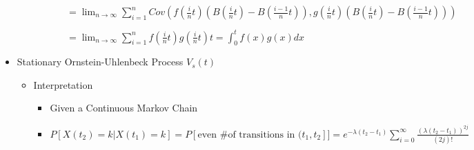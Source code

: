 \documentclass[a4paper]{article}
\begin{document}
\begin{itemize}
\begin{itemize}
\begin{itemize}
\begin{itemize}
                                $= \lim_{n \rightarrow \infty} \sum_{i=1}^n \mathit{Cov}(f(\frac{i}{n}t)(B(\frac{i}{n}t) - B(\frac{i-1}{n}t)), g(\frac{i}{n}t)(B(\frac{i}{n}t) - B(\frac{i-1}{n}t)))$

                                $= \lim_{n \rightarrow \infty} \sum_{i=1}^n f(\frac{i}{n}t)g(\frac{i}{n}t) t = \int_0^t f(x)g(x) dx$
                        \end{itemize}
                \end{itemize}
        \end{itemize}
    \item Stationary Ornstein-Uhlenbeck Process $V_s(t)$
        \begin{itemize}
            \item Interpretation
                \begin{itemize}
                    \item Given a Continuous Markov Chain
                    \item $P[X(t_2) = k | X(t_1) = k] = P[\text{even \# of transitions in } (t_1, t_2]] = e^{-\lambda (t_2 - t_1)} \sum_{i = 0}^\infty \frac{(\lambda (t_2 - t_1))^{2j}}{(2j)!}$


\end{itemize}
\end{itemize}
\end{itemize}
\end{document}
